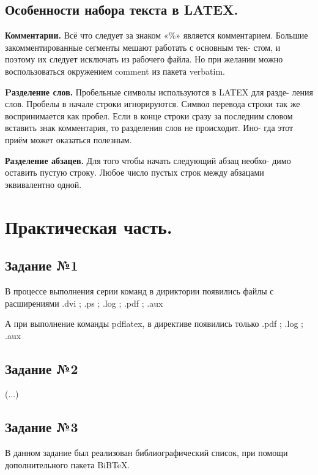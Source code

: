 \documentclass[a4peper,12pt]{report}
\begin{document}
\section{Особенности набора текста в LATEX.}

\textbf{Комментарии.} Всё что следует за знаком «\%» является комментарием. Большие закомментированные сегменты мешают работать с основным тек- стом, и поэтому их следует исключать из рабочего файла. Но при желании можно воспользоваться окружением comment из пакета verbatim.

\textbf{Pазделение слов.} Пробельные символы используются в LATEX для разде- ления слов. Пробелы в начале строки игнорируются. Символ перевода строки так же воспринимается как пробел. Если в конце строки сразу за последним словом вставить знак комментария, то разделения слов не происходит. Ино- гда этот приём может оказаться полезным.

\textbf{Разделение абзацев.} Для того чтобы начать следующий абзац необхо- димо оставить пустую строку. Любое число пустых строк между абзацами эквивалентно одной.

\chapter{Практическая часть.}
\section{Задание №1}
В процессе выполнения серии команд в дириктории  появились файлы с расширениями .dvi ; 
.ps ; .log ; .pdf ; .aux

А при выполнение команды pdflatex, в директиве появились только .pdf ; .log ; .aux 
\section{Задание №2}

(...) 

\section{Задание №3}
В данном задание был реализован библиографический список, при помощи дополнительного пакета BiBTeX.
\end{document}
